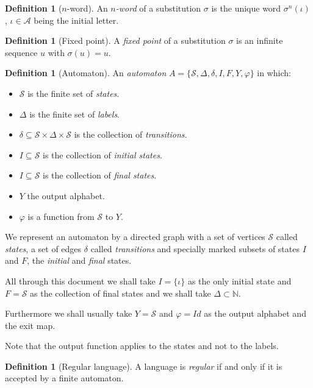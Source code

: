 \documentclass{article}
\theoremstyle{definition}
\newtheorem{definition}[theorem]{Definition}
\begin{document}
\begin{definition}[$n$-word] \label{def:n-word}
An \emph{$n$-word} of a substitution $\sigma$ is the unique word 
$\sigma^n(\iota)$, $\iota \in \mathcal{A}$ being the initial letter.

\begin{definition}[Fixed point] \label{def:fixed_point}
A \emph{fixed point} of a substitution $\sigma$ is an infinite sequence $u$ 
with $\sigma(u) = u$.
\end{definition}

\begin{definition}[Automaton] \label{def:automaton}
An \emph{automaton} $A = \{\mathcal{S}, \Delta, \delta, I, F, Y, \varphi\}$ in 
which:
\begin{itemize}
\item $\mathcal{S}$ is the finite set of \emph{states}.
\item $\Delta$ is the finite set of \emph{labels}.
\item $\delta \subseteq \mathcal{S} \times \Delta \times \mathcal{S}$ is the
      collection of \emph{transitions}.
\item $I \subseteq \mathcal{S}$ is the collection of \emph{initial states}.
\item $I \subseteq \mathcal{S}$ is the collection of \emph{final states}.
\item $Y$ the output alphabet.
\item $\varphi$ is a function from $\mathcal{S}$ to $Y$.
\end{itemize}
\end{definition}

We represent an automaton by a directed graph with a set of vertices
$\mathcal{S}$ called \emph{states}, a set of edges $\delta$ called
\emph{transitions} and specially marked subsets of states $I$ and $F$, the
\emph{initial} and \emph{final} states.

All through this document we shall take $I = \{\iota\}$ as the only initial
state and $F = \mathcal{S}$ as the collection of final states and we shall
take $\Delta \subset \mathbb{N}$.

Furthermore we shall usually take $Y = \mathcal{S}$ and $\varphi = Id$ as the
output alphabet and the exit map.

Note that the output function applies to the states and not to the labels.
\end{definition}

\begin{definition}[Regular language] \label{def:regular_language}
A language is \emph{regular} if and only if it is accepted by a finite 
automaton.
\end{definition}
\end{document}
